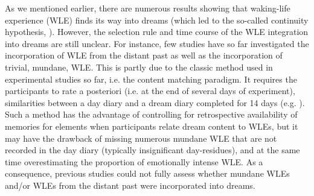 As we mentioned earlier, there are numerous results showing that waking-life experience (WLE) finds its way into dreams (which led to the so-called continuity hypothesis, \citealp{schredl_continuity_2003}). However, the selection rule and time course of the WLE integration into dreams are still unclear. For instance, few studies have so far investigated the incorporation of WLE from the distant past as well as the incorporation of trivial, mundane, WLE. This is partly due to  the classic method used in experimental studies so far, i.e. the content matching paradigm. It requires the participants to rate a posteriori (i.e. at the end of several days of experiment), similarities between a day diary and a dream diary completed for 14 days (e.g. \citealp{schredl_factors_2006, malinowski_evidence_2014}). Such a method has the advantage of controlling for retrospective availability of memories for elements when participants relate dream content to WLEs, but it may have the drawback of missing numerous mundane WLE that are not recorded in the day diary (typically insignificant day-residues), and at the same time overestimating the proportion of emotionally intense WLE. As a consequence, previous studies could not fully assess whether mundane WLEs and/or WLEs from the distant past were incorporated into dreams.


